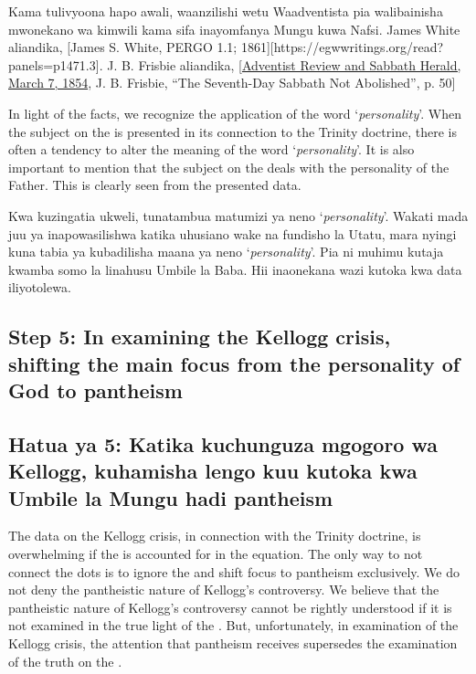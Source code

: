 Kama tulivyoona hapo awali, waanzilishi wetu Waadventista pia walibainisha mwonekano wa kimwili kama sifa inayomfanya Mungu kuwa Nafsi. James White aliandika, [James S. White, PERGO 1.1; 1861][https://egwwritings.org/read?panels=p1471.3]. J. B. Frisbie aliandika, [\href{https://documents.adventistarchives.org/Periodicals/RH/RH18540307-V05-07.pdf}{Adventist Review and Sabbath Herald, March 7, 1854}, J. B. Frisbie, “The Seventh-Day Sabbath Not Abolished”, p. 50]


In light of the facts, we recognize the application of the word ‘\textit{personality}’. When the subject on the  is presented in its connection to the Trinity doctrine, there is often a tendency to alter the meaning of the word ‘\textit{personality}’. It is also important to mention that the subject on the  deals with the personality of the Father. This is clearly seen from the presented data.


Kwa kuzingatia ukweli, tunatambua matumizi ya neno ‘\textit{personality}’. Wakati mada juu ya  inapowasilishwa katika uhusiano wake na fundisho la Utatu, mara nyingi kuna tabia ya kubadilisha maana ya neno ‘\textit{personality}’. Pia ni muhimu kutaja kwamba somo la  linahusu Umbile la Baba. Hii inaonekana wazi kutoka kwa data iliyotolewa.


\subsection*{Step 5: In examining the Kellogg crisis, shifting the main focus from the personality of God to pantheism}


\subsection*{Hatua ya 5: Katika kuchunguza mgogoro wa Kellogg, kuhamisha lengo kuu kutoka kwa Umbile la Mungu hadi pantheism}


The data on the Kellogg crisis, in connection with the Trinity doctrine, is overwhelming if the  is accounted for in the equation. The only way to not connect the dots is to ignore the  and shift focus to pantheism exclusively. We do not deny the pantheistic nature of Kellogg's controversy. We believe that the pantheistic nature of Kellogg's controversy cannot be rightly understood if it is not examined in the true light of the . But, unfortunately, in examination of the Kellogg crisis, the attention that pantheism receives supersedes the examination of the truth on the .


